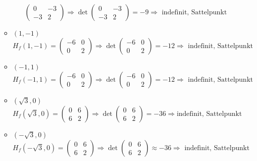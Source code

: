\documentclass[10pt,a4paper,parskip=half]{scrartcl}
\begin{document}
\begin{enumerate}[(i)]
\begin{itemize}
\[			\begin{pmatrix}
				0 & -3 \\
				-3 & 2		
			\end{pmatrix} \Rightarrow 
			\det \begin{pmatrix}
				0 & -3 \\
				-3 & 2		
			\end{pmatrix} = -9 \Rightarrow \text{ indefinit, Sattelpunkt}\]
		\item 	$(1,-1)$
			\[H_f(1,-1) = 
			\begin{pmatrix}
				-6 & 0 \\
				0 & 2		
			\end{pmatrix} \Rightarrow 
			\det \begin{pmatrix}
				-6 & 0 \\
				0 & 2		
			\end{pmatrix} = -12 \Rightarrow \text{ indefinit, Sattelpunkt}\]
		\item  	$(-1,1)$
			\[H_f(-1,1) = 
			\begin{pmatrix}
				-6 & 0 \\
				0 & 2		
			\end{pmatrix} \Rightarrow 
			\det \begin{pmatrix}
				-6 & 0 \\
				0 & 2		
			\end{pmatrix} = -12 \Rightarrow \text{ indefinit, Sattelpunkt}\]
		\item 	$(\sqrt{3},0)$
			\[H_f(\sqrt{3},0) = 
			\begin{pmatrix}
				0 & 6 \\
				6 & 2		
			\end{pmatrix} \Rightarrow 
			\det \begin{pmatrix}
				0 & 6 \\
				6 & 2	
			\end{pmatrix} = -36 \Rightarrow \text{indefinit, Sattelpunkt}\]
		\item  	$(-\sqrt{3},0)$
			\[H_f(-\sqrt{3},0) = 
			\begin{pmatrix}
				0 & 6 \\
				6 & 2		
			\end{pmatrix} \Rightarrow 
			\det \begin{pmatrix}
				0 & 6 \\
				6 & 2	
			\end{pmatrix} \approx -36 \Rightarrow \text{ indefinit, Sattelpunkt}\]
	\end{itemize}
	

\end{enumerate}
\end{document}
